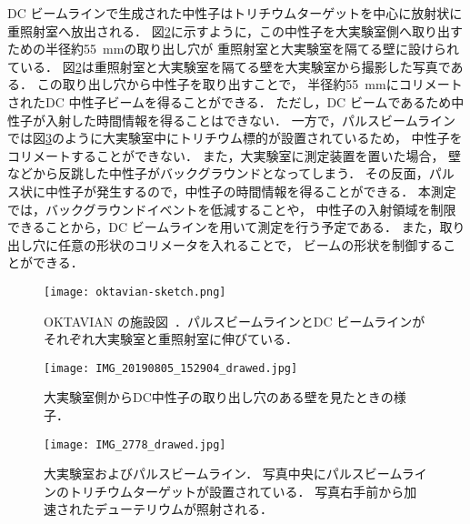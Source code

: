 \documentclass[../master]{subfiles}
\begin{document}
DC ビームラインで生成された中性子はトリチウムターゲットを中心に放射状に重照射室へ放出される．
図\ref{pic::hole}に示すように，この中性子を大実験室側へ取り出すための半径約\SI{55}{\milli\metre}の取り出し穴が
重照射室と大実験室を隔てる壁に設けられている．
図\ref{pic::hole}は重照射室と大実験室を隔てる壁を大実験室から撮影した写真である．
この取り出し穴から中性子を取り出すことで，
半径約\SI{55}{\milli\metre}にコリメートされたDC 中性子ビームを得ることができる．
ただし，DC ビームであるため中性子が入射した時間情報を得ることはできない．
一方で，パルスビームラインでは図\ref{pic::pulse_beam_line}のように大実験室中にトリチウム標的が設置されているため，
中性子をコリメートすることができない．
また，大実験室に測定装置を置いた場合，
壁などから反跳した中性子がバックグラウンドとなってしまう．
その反面，パルス状に中性子が発生するので，中性子の時間情報を得ることができる．
本測定では，バックグラウンドイベントを低減することや，
中性子の入射領域を制限できることから，DC ビームラインを用いて測定を行う予定である．
また，取り出し穴に任意の形状のコリメータを入れることで，
ビームの形状を制御することができる．
\begin{figure}
  \centering
  \texttt{[image: oktavian-sketch.png]}
  \caption[OKTAVIAN の施設図．]
          {OKTAVIAN の施設図~\cite{oktavian}．パルスビームラインとDC ビームラインがそれぞれ大実験室と重照射室に伸びている．}
  \label{pic::oktavian-sketch}
\end{figure}
\begin{figure}[h]
  \centering
  \texttt{[image: IMG\_20190805\_152904\_drawed.jpg]}
  \caption{大実験室側からDC中性子の取り出し穴のある壁を見たときの様子．}
  \label{pic::hole}
\end{figure}
\begin{figure}[h]
  \centering
  \texttt{[image: IMG\_2778\_drawed.jpg]}
  \caption[大実験室およびパルスビームライン．]
          {大実験室およびパルスビームライン．
            写真中央にパルスビームラインのトリチウムターゲットが設置されている．
          写真右手前から加速されたデューテリウムが照射される．}
  \label{pic::pulse_beam_line}
\end{figure}
\end{document}
